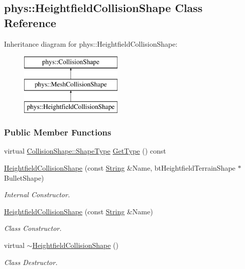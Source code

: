 \hypertarget{classphys_1_1HeightfieldCollisionShape}{
\subsection{phys::HeightfieldCollisionShape Class Reference}
\label{classphys_1_1HeightfieldCollisionShape}
}
Inheritance diagram for phys::HeightfieldCollisionShape:\begin{figure}[H]
\begin{center}
\leavevmode
\includegraphics[height=3.000000cm]{classphys_1_1HeightfieldCollisionShape}
\end{center}
\end{figure}
\subsubsection*{Public Member Functions}
\begin{DoxyCompactItemize}
\item 
virtual \hyperlink{classphys_1_1CollisionShape_af3ba4fd8af5b9557f912d2f5ff35a588}{CollisionShape::ShapeType} \hyperlink{classphys_1_1HeightfieldCollisionShape_a16790a33eadb743b71480f65a7bb8dd8}{GetType} () const 
\item 
\hyperlink{classphys_1_1HeightfieldCollisionShape_a981b017203cdf48dde5cb6fbf8156e49}{HeightfieldCollisionShape} (const \hyperlink{namespacephys_aa03900411993de7fbfec4789bc1d392e}{String} \&Name, btHeightfieldTerrainShape $\ast$BulletShape)
\begin{DoxyCompactList}\small\item\em Internal Constructor. \item\end{DoxyCompactList}\item 
\hyperlink{classphys_1_1HeightfieldCollisionShape_a71f2f687cbef4059b9546c5553c49b76}{HeightfieldCollisionShape} (const \hyperlink{namespacephys_aa03900411993de7fbfec4789bc1d392e}{String} \&Name)
\begin{DoxyCompactList}\small\item\em Class Constructor. \item\end{DoxyCompactList}\item 
\hypertarget{classphys_1_1HeightfieldCollisionShape_a599a30f17f702e45bde81760a70e0a68}{
virtual \hyperlink{classphys_1_1HeightfieldCollisionShape_a599a30f17f702e45bde81760a70e0a68}{$\sim$HeightfieldCollisionShape} ()}
\label{classphys_1_1HeightfieldCollisionShape_a599a30f17f702e45bde81760a70e0a68}

\begin{DoxyCompactList}\small\item\em Class Destructor. \item\end{DoxyCompactList}\end{DoxyCompactItemize}
